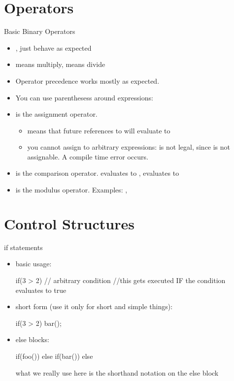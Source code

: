 \documentclass[10pt,graphics,aspectratio=169,table]{beamer}
\begin{document}
\section{Operators}
\begin{frame}[fragile]{Basic Binary Operators}
    \begin{itemize}
        \item \code{+}, \code{-} just behave as expected
        \item \code{*} means multiply, \code{/} means divide
        \item Operator precedence works mostly as expected.
        \item You can use parenthesess around expressions: 
        \item \code{=} is the assignment operator.
        \begin{itemize}
            \item
                 means that future references to 
                will evaluate to 
            \item
                you cannot assign to arbitrary expressions:
                 is not legal, since 
                is not assignable. A compile time error occurs.
        \end{itemize}
        \item \code{==} is the comparison operator.
             evaluates to ,
             evaluates to 
        \item
            \code{\%} is the modulus operator.
            Examples: , 
    \end{itemize}
\end{frame}

\section{Control Structures}
\begin{frame}[fragile]{if statements}
    \begin{itemize}
    \item basic usage:
        \begin{codeblock}
if(3 > 2){  // arbitrary condition
    //this gets executed IF the condition evaluates to true
}
        \end{codeblock}
    \item short form (use it only for short and simple things):
        \begin{codeblock}
if(3 > 2) bar();
        \end{codeblock}

    \item else blocks:
        \begin{codeblock}
if(foo()){
}
else if(bar()){
}
else{
}
        \end{codeblock}

        what we really use here is the shorthand notation on the else block

    \end{itemize}
\end{frame}
\end{document}
